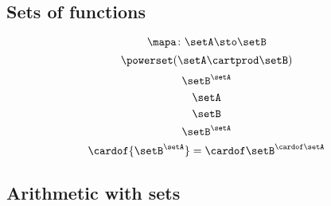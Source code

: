 {\begin{forslides}
        \subsection{Sets of functions}

        \begin{equation}
            \label{eq:slides_session2_156}
            \mapa \colon \setA \sto \setB
        \end{equation}
        \begin{equation}
            \label{eq:slides_session2_157}
            \powerset (\setA \cartprod \setB)
        \end{equation}
        \begin{equation}
            \label{eq:slides_session2_158}
            \setB^{\setA}
        \end{equation}
        \begin{equation}
            \label{eq:slides_session2_159}
            \setA
        \end{equation}
        \begin{equation}
            \label{eq:slides_session2_160}
            \setB
        \end{equation}
        \begin{equation}
            \label{eq:slides_session2_161}
            \setB^{\setA}
        \end{equation}
        \begin{equation}
            \label{eq:slides_session2_162}
            \cardof {\setB^{\setA}}  = {\cardof \setB} ^{\cardof \setA}
        \end{equation}

        \subsection{Arithmetic with sets}


\end{forslides}}

